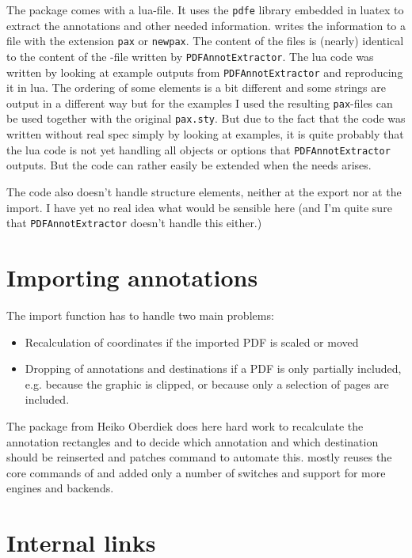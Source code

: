 \documentclass[DIV=12,parskip=half-,bibliography=totoc]{scrartcl}
\begin{document}
The  package comes with a lua-file. It uses the \texttt{pdfe} library embedded in luatex to extract the annotations and other needed information.  writes the information to a file with the extension \texttt{pax} or \texttt{newpax}. The content of the files is (nearly) identical to the content of the -file written by \texttt{PDFAnnotExtractor}. The lua code was written by looking at example outputs from \texttt{PDFAnnotExtractor} and reproducing it in lua. The ordering of some elements is a bit different and some strings are output in a different way but for the examples I used the resulting \texttt{pax}-files can be used together with the original \texttt{pax.sty}. But due to the fact that the code was written without real spec simply by looking at examples, it is quite probably that the lua code is not yet handling all objects or options that \texttt{PDFAnnotExtractor} outputs.  But the code can rather easily be extended when the needs arises.

The code also doesn't handle structure elements, neither at the export nor at the import. I have yet no real idea what would be sensible here (and I'm quite sure that \texttt{PDFAnnotExtractor}  doesn't handle this either.)


\section{Importing annotations}

The import function has to handle two main problems: 
\begin{itemize}
\item Recalculation of coordinates if the imported PDF is scaled or moved
\item Dropping of annotations and destinations if a PDF is only partially included, e.g. because the graphic is clipped, or because only a selection of pages are included. 
\end{itemize}    

The  package from Heiko Oberdiek does here hard work to recalculate the annotation rectangles and to decide which annotation and which destination should be reinserted and patches  command to automate this.  mostly reuses the core commands of  and added only a number of switches and support for more engines and backends.

\section{Internal links}
\end{document}

